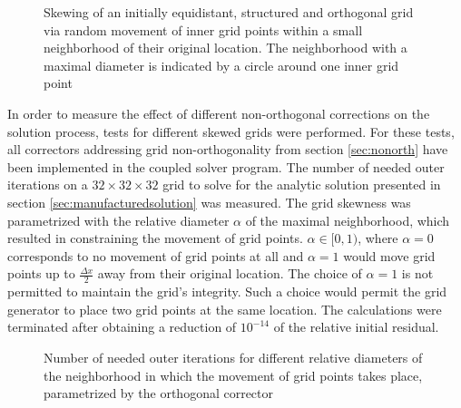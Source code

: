 \begin{figure}[h!]
  \begin{center}
    
    \caption{Skewing of an initially equidistant, structured and orthogonal grid via random movement of inner grid points within a small neighborhood of their original location. The neighborhood with a maximal diameter is indicated by a circle around one inner grid point}
    \label{fig:nonorthgrid}
  \end{center}
\end{figure}

In order to measure the effect of different non-orthogonal corrections on the solution process, tests for different skewed grids were performed. For these tests, all correctors addressing grid non-orthogonality from section \ref{sec:nonorth} have been implemented in the coupled solver program. The number of needed outer iterations on a \(32\times32\times32\) grid to solve for the analytic solution presented in section \ref{sec:manufacturedsolution} was measured. The grid skewness was parametrized with the relative diameter \(\alpha\) of the maximal neighborhood, which resulted in constraining the movement of grid points. \(\alpha \in [0,1) \), where \(\alpha = 0\) corresponds to no movement of grid points at all and \(\alpha = 1\) would move grid points up to \(\textstyle \frac{\Delta x}{2} \) away from their original location. The choice of \(\alpha = 1\) is not permitted to maintain the grid's integrity. Such a choice would permit the grid generator to place two grid points at the same location. The calculations were terminated after obtaining a reduction of \(10^{-14}\) of the relative initial residual.

\begin{figure}
  \begin{center}
  \end{center}
\caption{Number of needed outer iterations for different relative diameters of the neighborhood in which the movement of grid points takes place, parametrized by the orthogonal corrector}
\label{fig:nonorth}
\end{figure}

